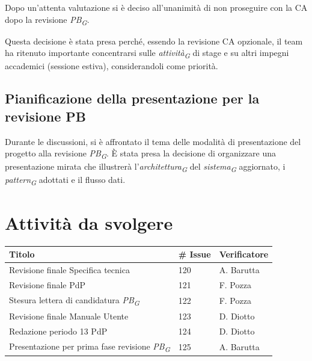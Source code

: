 \documentclass{article}
\begin{document}
    Dopo un'attenta valutazione si è deciso all'unanimità di non proseguire con la CA dopo la revisione \textit{PB}\textsubscript{\textit{G}}. 
    
    Questa decisione è stata presa perché, essendo la revisione CA opzionale, il team ha ritenuto importante concentrarsi sulle \textit{attività}\textsubscript{\textit{G}} di stage e su altri impegni accademici (sessione estiva), considerandoli come priorità.

    \subsection{Pianificazione della presentazione per la revisione PB}
    Durante le discussioni, si è affrontato il tema delle modalità di presentazione del progetto alla revisione \textit{PB}\textsubscript{\textit{G}}. È stata presa la decisione di organizzare una presentazione mirata che illustrerà l'\textit{architettura}\textsubscript{\textit{G}} del \textit{sistema}\textsubscript{\textit{G}} aggiornato, i \textit{pattern}\textsubscript{\textit{G}} adottati e il flusso dati.

    \section{Attività da svolgere}
    \begin{center}
        \begin{tabular}{|C{7cm}|C{1,5cm}|C{3cm}|}
            \hline
            \textbf{Titolo} & \textbf{\# Issue} & \textbf{Verificatore} \\
            \hline
            \hline
            Revisione finale Specifica tecnica & 120 & A. Barutta \\
            \hline
            Revisione finale PdP & 121 & F. Pozza \\
            \hline
            Stesura lettera di candidatura \textit{PB}\textsubscript{\textit{G}} & 122 & F. Pozza \\
            \hline
            Revisione finale Manuale Utente & 123 & D. Diotto \\
            \hline
            Redazione periodo 13 PdP & 124 & D. Diotto \\
            \hline
            Presentazione per prima fase revisione \textit{PB}\textsubscript{\textit{G}} & 125 & A. Barutta \\
            \hline
        \end{tabular}
    \end{center}
\end{document}
